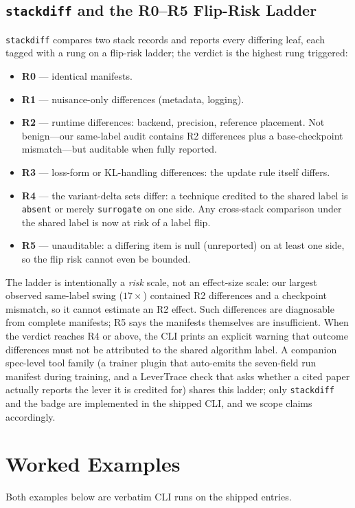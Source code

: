\documentclass{article}
\begin{document}
\subsection{\texttt{stackdiff} and the R0--R5 Flip-Risk Ladder}
\label{sec:p6-stackdiff}
\texttt{stackdiff} compares two stack records and reports every differing
leaf, each tagged with a rung on a flip-risk ladder; the verdict is the
highest rung triggered:

\begin{itemize}[leftmargin=1.5em, itemsep=0.1em]
  \item \textbf{R0} --- identical manifests.
  \item \textbf{R1} --- nuisance-only differences (metadata, logging).
  \item \textbf{R2} --- runtime differences: backend, precision, reference
        placement. Not benign---our same-label audit contains R2 differences
        plus a base-checkpoint mismatch---but auditable when fully reported.
  \item \textbf{R3} --- loss-form or KL-handling differences: the update rule
        itself differs.
  \item \textbf{R4} --- the variant-delta sets differ: a technique credited to
        the shared label is \texttt{absent} or merely \texttt{surrogate} on
        one side. Any cross-stack comparison under the shared label is now at
        risk of a label flip.
  \item \textbf{R5} --- unauditable: a differing item is null (unreported) on
        at least one side, so the flip risk cannot even be bounded.
\end{itemize}

The ladder is intentionally a \emph{risk} scale, not an effect-size scale: our
largest observed same-label swing ($17\times$) contained R2 differences and a
checkpoint mismatch, so it cannot estimate an R2 effect. Such differences are
diagnosable from complete manifests; R5 says the manifests themselves are
insufficient. When the verdict reaches R4 or above, the CLI prints an explicit
warning that outcome differences must not be attributed to the shared
algorithm label. A companion spec-level tool family (a trainer plugin that
auto-emits the seven-field run manifest during training, and a LeverTrace check
that asks whether a cited paper actually reports the lever it is credited for)
shares this ladder; only \texttt{stackdiff} and the badge are implemented in
the shipped CLI, and we scope claims accordingly.
 \section{Worked Examples}
\label{sec:p6-worked}
Both examples below are verbatim CLI runs on the shipped entries.
\end{document}
